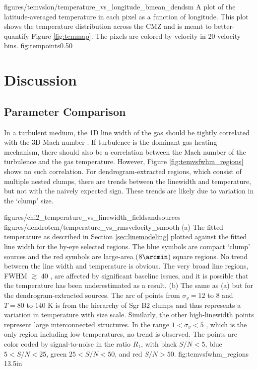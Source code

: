 \Figure
{figures/temvslon/temperature_vs_longitude_bmean_dendsm}
{A plot of the latitude-averaged temperature in each pixel as a function of
longitude.  This plot shows the temperature distribution across the CMZ and is
meant to better-quantify Figure \ref{fig:temmap}.  The pixels are colored by
velocity in 20 \kms velocity bins.}
{fig:tempoints}{0.5}{0}

\section{Discussion}
\label{sec:discussion}
\subsection{Parameter Comparison}
In a turbulent medium, the 1D line width of the gas should be tightly
correlated with the 3D Mach number \citep[e.g.][]{Federrath2011a}.  If
turbulence is the dominant gas heating mechanism, there should also be a
correlation between the Mach number of the turbulence and the gas temperature.
However, Figure \ref{fig:temvsfwhm_regions} shows no such correlation.  For
dendrogram-extracted regions, which consist of multiple nested clumps, there
are trends between the linewidth and temperature, but not with the naively
expected sign.  These trends are likely due to variation in the `clump' size.

\FigureTwo
{figures/chi2_temperature_vs_linewidth_fieldsandsources}
{figures/dendrotem/temperature_vs_rmsvelocity_smooth} %
{(a) 
The fitted temperature as described in Section \ref{sec:linemodeling} plotted
against the fitted line width for the by-eye selected regions.  The blue
symbols are compact `clump' sources and the red symbols are large-area
($8\arcmin$) square regions.  No trend between the line width and temperature
is obvious.  The very broad line regions, FWHM $\gtrsim$ 40 \kms, are affected
by significant baseline issues, and it is possible that the temperature has been
underestimated as a result.
(b) The same as (a) but for the dendrogram-extracted sources.  The arc of points
from $\sigma_v=12$ to $8$ \kms and $T=80$ to $140$ K is from the hierarchy of
Sgr B2 clumps and thus represents a variation in temperature with size scale.
Similarly, the other high-linewidth points represent large interconnected
structures.  In the range $1 < \sigma_v < 5$ \kms, which is the only region
including low temperatures, no trend is observed.  The points are color coded
by signal-to-noise in the ratio $R_1$, with black $S/N < 5$, blue $5 < S/N <
25$, green $25 < S/N < 50$, and red $S/N > 50$.  }
{fig:temvsfwhm_regions}
{1}{3.5in}



